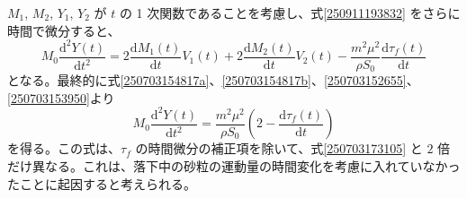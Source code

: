 \documentclass[]{article}
\begin{document}
$M_1$, $M_2$, $Y_1$, $Y_2$ が $t$ の 1 次関数であることを考慮し、式\eqref{250911193832} をさらに時間で微分すると、
\begin{equation} \label{250911194752}
   M_0\frac{\mathrm{d}^2Y(t)}{\mathrm{d}t^2} = 2\frac{\mathrm{d}M_1(t)}{\mathrm{d}t} V_1(t) + 2\frac{\mathrm{d}M_2(t)}{\mathrm{d}t} V_2(t) - \frac{m^2\mu^2}{\rho S_0}\frac{\mathrm{d}\tau_f(t)}{\mathrm{d}t}
\end{equation}
となる。最終的に式\eqref{250703154817a}、\eqref{250703154817b}、\eqref{250703152655}、\eqref{250703153950}より
\begin{equation} \label{250911195249}
   M_0\frac{\mathrm{d}^2Y(t)}{\mathrm{d}t^2} = \frac{m^2\mu^2}{\rho S_0}\left(2 - \frac{\mathrm{d}\tau_f(t)}{\mathrm{d}t}\right)
\end{equation}
を得る。この式は、$\tau_f$ の時間微分の補正項を除いて、式\eqref{250703173105} と $2$ 倍だけ異なる。これは、落下中の砂粒の運動量の時間変化を考慮に入れていなかったことに起因すると考えられる。
\end{document}
